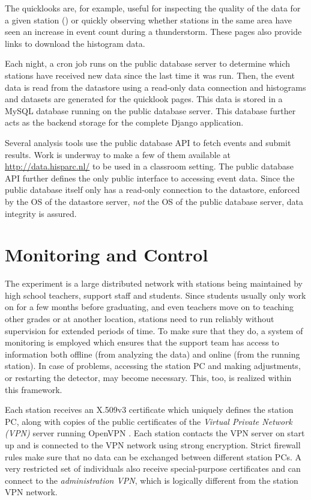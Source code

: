 The quicklooks are, for example, useful for inspecting the quality of the data
for a given station () or quickly observing
whether stations in the same area have seen an increase in event count during a
thunderstorm.  These pages also provide links to download the histogram data.

Each night, a cron job runs on the public database server to determine which
stations have received new data since the last time it was run.  Then, the event
data is read from the datastore using a read-only data connection and histograms
and datasets are generated for the quicklook pages.  This data is stored in a
MySQL database running on the public database server.  This database further
acts as the backend storage for the complete Django application.

Several analysis tools use the public database API to fetch events
and submit results.  Work is underway to make a few of them available at
\url{http://data.hisparc.nl/} to be used in a classroom setting.  The public
database API further defines the only public interface to accessing \hisparc
event data.  Since the public database itself only has a read-only connection to
the datastore, enforced by the OS of the datastore server, \emph{not} the OS of
the public database server, data integrity is assured.


\section{Monitoring and Control}

The \hisparc experiment is a large distributed network with stations being
maintained by high school teachers, support staff and students.  Since students
usually only work on \hisparc for a few months before graduating, and even
teachers move on to teaching other grades or at another location, \hisparc
stations need to run reliably without supervision for extended periods of time.
To make sure that they do, a system of monitoring is employed which ensures that
the \hisparc support team has access to information both offline (from
analyzing the data) and online (from the running station).  In case of problems,
accessing the station PC and making adjustments, or restarting the detector,
may become necessary.
This, too, is realized within this framework.

Each station receives an X.509v3 certificate which uniquely defines the station
PC, along with copies of the public certificates of the \emph{Virtual Private
Network (VPN)} server running OpenVPN \cite{OpenVPN}.  Each station contacts the
VPN server on start up and is connected to the \hisparc VPN network using strong
encryption. Strict firewall rules make sure that no data can be exchanged
between different station PCs.  A very restricted set of individuals also
receive special-purpose certificates and can connect to the \hisparc
\emph{administration VPN}, which is logically different from the station VPN
network.

